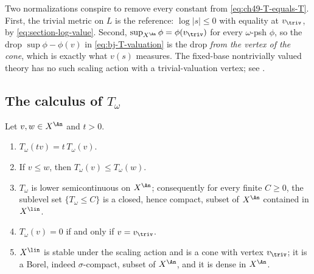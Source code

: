 \begin{remark}
\label{rem:ch49-no-constant}
Two normalizations conspire to remove every constant from
\eqref{eq:ch49-T-equals-T}.  First, the trivial metric on $L$ is the
reference: $\log|s|\le0$ with equality at $v_{\triv}$, by
\eqref{eq:section-log-value}.  Second, $\sup_{X^{\An}}\phi=\phi(v_{\triv})$
for every $\omega$-psh $\phi$, so the drop
$\sup\phi-\phi(v)$ in \eqref{eq:bj-T-valuation} is the drop \emph{from
the vertex of the cone}, which is exactly what $v(s)$ measures.  The fixed-base nontrivially valued theory has no such scaling action
with a trivial-valuation vertex; see .
\end{remark}

\subsection{The calculus of \texorpdfstring{$T_\omega$}{T}}
\label{sec:ch49-T-calculus}

\begin{proposition}
\label{prop:ch49-T-elementary}
Let $v,w\in X^{\An}$ and $t>0$.
\begin{enumerate}
\item\label{itm:ch49-T:homog}
      $T_\omega(tv)=t\,T_\omega(v)$.
\item\label{itm:ch49-T:order}
      If $v\le w$, then $T_\omega(v)\le T_\omega(w)$.
\item\label{itm:ch49-T:lsc}
      $T_\omega$ is lower semicontinuous on $X^{\An}$; consequently
      for every finite $C\ge0$, the sublevel set $\{T_\omega\le C\}$
      is a closed, hence compact, subset of $X^{\An}$ contained in
      $X^{\lin}$.
\item\label{itm:ch49-T:zero}
      $T_\omega(v)=0$ if and only if $v=v_{\triv}$.
\item\label{itm:ch49-T:cone}
      $X^{\lin}$ is stable under the scaling action and is a cone with
      vertex $v_{\triv}$; it is a Borel, indeed
      $\sigma$-compact, subset of $X^{\An}$, and it is dense in
      $X^{\An}$.
\end{enumerate}
\end{proposition}

